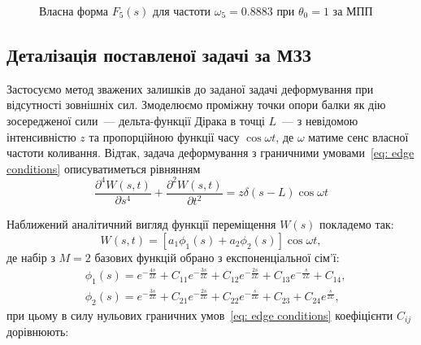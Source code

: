 \documentclass{mathreport}
\begin{document}
\begin{figure}[H]\centering
    \resizebox{\linewidth}{!}{}
    \caption{Власна форма $F_5(s)$ для частоти $\omega_5 = 0.8883$ при $\theta_0=1$ за МПП}
    \label{pic: TMM F5(s) eigenvector}
\end{figure}


\subsection*{Деталізація поставленої задачі за МЗЗ}
\label{section: WRM detalization}

Застосуємо метод зважених залишків до заданої задачі деформування при відсутності зовнішніх сил. Змоделюємо проміжну точки опори балки як дію зосередженої сили~--- дельта-функції Дірака в точці $L$~--- з невідомою інтенсивністю $z$ та пропорційною функції часу $\cos{\omega t}$, де $\omega$ матиме сенс власної частоти коливання. Відтак, задача деформування з граничними умовами~\eqref{eq: edge conditions} описуватиметься рівнянням
\begin{equation}\label{eq: homogeneous d.e. WRM}
    \frac{\partial^4 W(s,t)}{\partial s^4} + \frac{\partial^2 W(s,t)}{\partial t^2} =  z\delta(s-L)\cos{\omega t}
\end{equation}

Наближений аналітичний вигляд функції переміщення $W(s)$ покладемо так:
\begin{equation}\label{eq: W(s) M=2 approximation}
    W(s,t) = \left[ a_1\phi_1(s) + a_2\phi_2(s) \right] \cos{\omega t},
\end{equation}
де набір з $M=2$ базових функцій обрано з експоненціальної сім'ї:
\begin{align}
    & \phi_1(s) = e^{-\frac{4s}{2L}} + C_{11}e^{-\frac{3s}{2L}} + C_{12}e^{-\frac{2s}{2L}} + C_{13}e^{-\frac{s}{2L}} + C_{14}, \label{eq: M=2 trial phi1(x)} \\
    & \phi_2(s) = e^{-\frac{3s}{2L}} + C_{21}e^{-\frac{2s}{2L}} + C_{22}e^{-\frac{s}{2L}} + C_{23} + C_{24}e^{\frac{s}{2L}} \label{eq:  M=2 trial phi2(x)},
\end{align}
при цьому в силу нульових граничних умов~\eqref{eq: edge conditions} коефіцієнти $C_{ij}$ дорівнюють:
\end{document}
